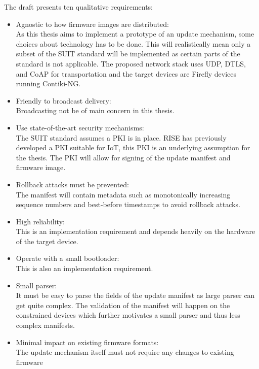 \documentclass[0-thesis.tex]{subfiles}
\begin{document}
The draft \parencite{suit-architecture} presents ten qualitative requirements:
\begin{itemize}
    \item Agnostic to how firmware images are distributed:\\
            As this thesis aims to implement a prototype of an update mechanism, 
            some choices about technology has to be done. This will realistically mean 
            only a subset of the SUIT standard will be implemented as certain parts of the 
            standard is not applicable. The proposed network stack uses UDP, DTLS, and CoAP 
            for transportation and the target devices are Firefly devices running Contiki-NG.
    \item Friendly to broadcast delivery:\\
            Broadcasting not be of main concern in this thesis.
    \item Use state-of-the-art security mechanisms:\\
            The SUIT standard assumes a PKI is in place. RISE has previously developed a PKI
            suitable for IoT, this PKI is an underlying assumption for the thesis. The PKI 
            will allow for signing of the update manifest and firmware image.
    \item Rollback attacks must be prevented:\\
            The manifest will contain metadata such as monotonically increasing sequence 
            numbers and best-before timestamps to avoid rollback attacks.
    \item High reliability:\\
            This is an implementation requirement and depends heavily on the hardware of the 
            target device.
    \item Operate with a small bootloader:\\
            This is also an implementation requirement.
    \item Small parser:\\
            It must be easy to parse the fields of the update manifest as large parser can 
            get quite complex. The validation of the manifest will happen on the constrained 
            devices which further motivates a small parser and thus less complex manifests.
    \item Minimal impact on existing firmware formats:\\
            The update mechanism itself must not require any changes to existing firmware 

\end{itemize}
\end{document}
